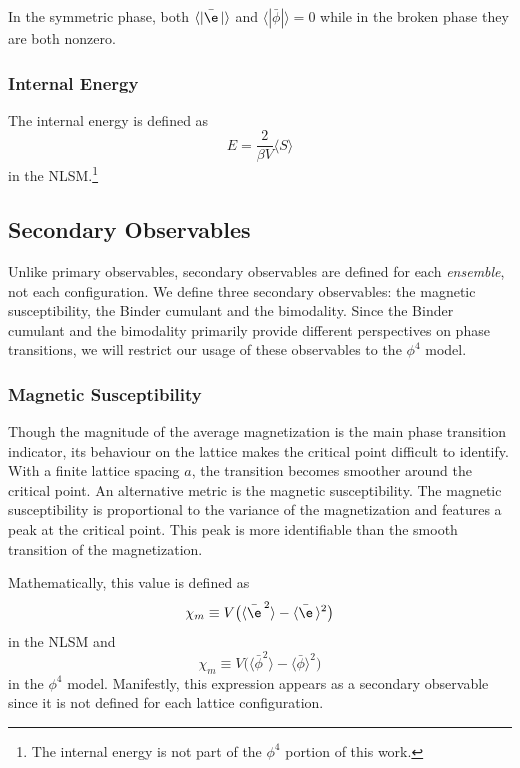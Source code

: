 In the symmetric phase, both $\langle |\bar\e\,| \rangle$ and $\langle |\bar\phi| \rangle = 0$ while in the broken phase they are both nonzero.

\subsubsection{Internal Energy}
The internal energy is defined as \cite{berg1981}
\begin{equation}
    E = \frac{2}{\beta V} \langle S \rangle
\end{equation}
in the NLSM.\footnote{The internal energy is not part of the $\phi^4$ portion of this work.}



\subsection{Secondary Observables}
Unlike primary observables, secondary observables are defined for each \textit{ensemble}, not each configuration. We define three secondary observables: the magnetic susceptibility, the Binder cumulant and the bimodality. Since the Binder cumulant and the bimodality primarily provide different perspectives on phase transitions, we will restrict our usage of these observables to the $\phi^4$ model.

\subsubsection{Magnetic Susceptibility}
Though the magnitude of the average magnetization is the main phase transition indicator, its behaviour on the lattice makes the critical point difficult to identify. With a finite lattice spacing $a$, the transition becomes smoother around the critical point. An alternative metric is the magnetic susceptibility. The magnetic susceptibility is proportional to the variance of the magnetization and features a peak at the critical point. This peak is more identifiable than the smooth transition of the magnetization. 

Mathematically, this value is defined as 
\begin{equation}
    \chi_m \equiv V \big(\langle {\bar\e\,}^2 \rangle - \langle \bar\e\, \rangle^2\big)
\end{equation}
in the NLSM and
\begin{equation}
    \chi_m \equiv V \big(\langle {\bar\phi}^2 \rangle - \langle \bar\phi \rangle^2\big)
\end{equation}
in the $\phi^4$ model. Manifestly, this expression appears as a secondary observable since it is not defined for each lattice configuration. 

